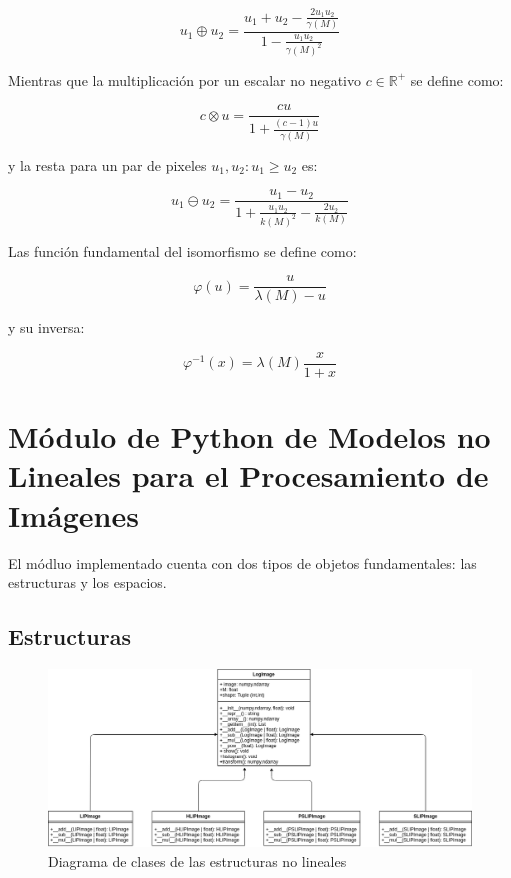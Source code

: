\begin{equation}
	u_1\oplus u_2=\frac{u_1+u_2-\frac{2u_1u_2}{\gamma(M)}}{1-\frac{u_1u_2}{\gamma(M)^2}}
\end{equation}

Mientras que la multiplicaci\'on por un escalar no negativo $c\in\mathbb{R}^+$ se define como:

\begin{equation}
	c\otimes u=\frac{cu}{1+\frac{(c-1)u}{\gamma(M)}}
\end{equation}

y la resta para un par de pixeles $u_1,u_2:u_1\geq u_2$ es:

\begin{equation}
	u_1\ominus u_2=\frac{u_1-u_2}{1+\frac{u_1u_2}{k(M)^2}-\frac{2u_2}{k(M)}}
\end{equation}

Las funci\'on fundamental del isomorfismo se define como:

\begin{equation}
	\varphi(u)=\frac{u}{\lambda(M)-u}
\end{equation}

y su inversa:

\begin{equation}
	\varphi^{-1}(x)=\lambda(M)\frac{x}{1+x}
\end{equation}

\section{M\'odulo de Python de Modelos no Lineales para el Procesamiento de Im\'agenes}

El m\'odluo implementado cuenta con dos tipos de objetos fundamentales: las estructuras y los espacios.

\subsection{Estructuras}

\begin{figure}
	\begin{center}
		\includegraphics[width=16.0 cm]{images/structures_class_diagram.png}
		\caption{Diagrama de clases de las estructuras no lineales}
	\end{center}
\end{figure}

